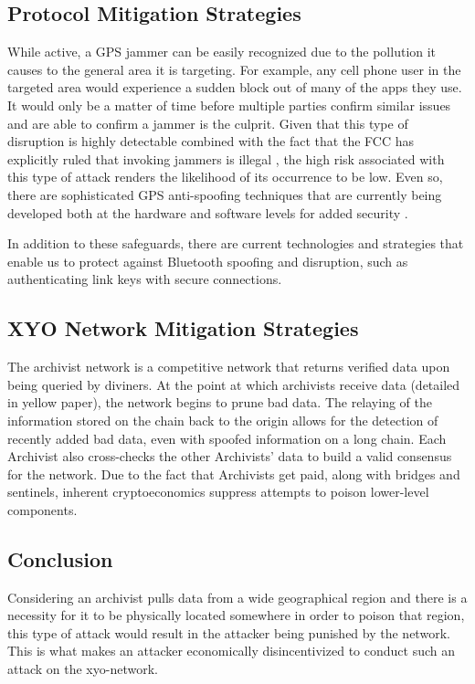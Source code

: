 \documentclass{article}
\begin{document}
\subsection{Protocol Mitigation Strategies}
While active, a GPS jammer can be easily recognized due to the pollution it causes to the general area it is targeting. For example, any cell phone user in the targeted area would experience a sudden block out of many of the apps they use. It would only be a matter of time before multiple parties confirm similar issues and are able to confirm a jammer is the culprit. Given that this type of disruption is highly detectable combined with the fact that the FCC has explicitly ruled that invoking jammers is illegal \cite{chief-fcc}, the high risk associated with this type of attack renders the likelihood of its occurrence to be low. Even so, there are sophisticated GPS anti-spoofing techniques that are currently being developed both at the hardware and software levels for added security \cite{jafarina-gps}.

In addition to these safeguards, there are current technologies and strategies that enable us to protect against Bluetooth spoofing and disruption, such as authenticating link keys with secure connections. \cite{dunning-bluetooth}

\subsection{XYO Network Mitigation Strategies}
The \Gls{archivist} network is a competitive network that returns verified data upon being queried by \Glspl{diviner}. At the point at which \Glspl{archivist} receive data (detailed in yellow paper), the network begins to prune bad data. The relaying of the information stored on the chain back to the origin allows for the detection of recently added bad data, even with spoofed information on a long chain. Each Archivist also cross-checks the other Archivists' data to build a valid consensus for the network. Due to the fact that Archivists get paid, along with \Glspl{bridge} and \Glspl{sentinel}, inherent \gls{cryptoeconomics} suppress attempts to poison lower-level components.

\subsection{Conclusion}
Considering an \Gls{archivist} pulls data from a wide geographical region and there is a necessity for it to be physically located somewhere in order to poison that region, this type of attack would result in the attacker being punished by the network. This is what makes an attacker economically disincentivized to conduct such an attack on the \Gls{xyo-network}.  
\end{document}
